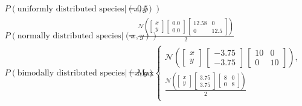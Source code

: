 \begin{align*}
\\
P \left( \text{uniformly distributed species} | \left( x, y \right) \right) &= 0.5 \tag*{eqn 4a} \\
%
P \left( \text{normally distributed species} | \left( x , y \right) \right) &= \frac{\mathcal{N} \left( \left[ \begin{smallmatrix} x \\ y \end{smallmatrix} \right] \, \left[ \begin{smallmatrix} 0.0 \\ 0.0 \end{smallmatrix} \right] \, \left[ \begin{smallmatrix} 12.58&0 \\ 0&12.5 \end{smallmatrix} \right] \right)}{2} \tag*{eqn 4b} \\
%
P \left( \text{bimodally distributed species} | \left( x,y \right) \right) &= \text{Max} \begin{cases}
\mathcal{N} \left(\left[ \begin{smallmatrix} x \\ y \end{smallmatrix} \right] \, \left[ \begin{smallmatrix} -3.75 \\ -3.75 \end{smallmatrix} \right] \, \left[ \begin{smallmatrix} 10&0 \\ 0&10 \end{smallmatrix} \right] \right), \\ \frac{\mathcal{N} \left( \left[ \begin{smallmatrix} x \\ y \end{smallmatrix} \right] \, \left[ \begin{smallmatrix} 3.75 \\ 3.75 \end{smallmatrix} \right] \, \left[ \begin{smallmatrix} 8&0 \\ 0&8 \end{smallmatrix} \right] \right)} {2} \\
\end{cases} \tag*{eqn 4c} \\
%
\end{align*}

